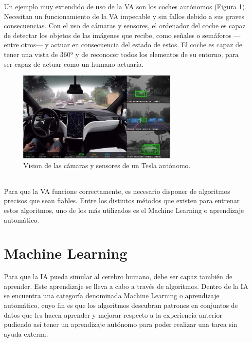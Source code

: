 Un ejemplo muy extendido de uso de la VA son los coches autónomos (Figura \ref{fig:tesla}). Necesitan un funcionamiento de la VA impecable y sin fallos debido a sus graves consecuencias. Con el uso de cámaras y sensores, el ordenador del coche es capaz de detectar los objetos de las imágenes que recibe, como señales o semáforos ---entre otros--- y actuar en consecuencia del estado de estos. El coche es capaz de tener una vista de 360º y de reconocer todos los elementos de su entorno, para ser capaz de actuar como un humano actuaría.
\begin{figure} [h!]
  \begin{center}
    \includegraphics[width=8cm]{figs/coche_autonomo}
  \end{center}
  \caption[]{Vision de las cámaras y sensores de un Tesla autónomo. \footnotemark}
  \label{fig:tesla}
\end{figure}\\

Para que la VA funcione correctamente, es necesario disponer de algoritmos precisos que sean fiables. Entre los distintos métodos que existen para entrenar estos algoritmos, uno de los más utilizados es el Machine Learning o aprendizaje automático.

\section{Machine Learning}
Para que la IA pueda simular al cerebro humano, debe ser capaz también de aprender. Este aprendizaje se lleva a cabo a través de algoritmos. Dentro de la IA se encuentra una categoría denominada Machine Learning o aprendizaje automático, cuyo fin es que los algoritmos descubran patrones en conjuntos de datos que les hacen aprender y mejorar respecto a la experiencia anterior pudiendo así tener un aprendizaje autónomo para poder realizar una tarea sin ayuda externa.\\

